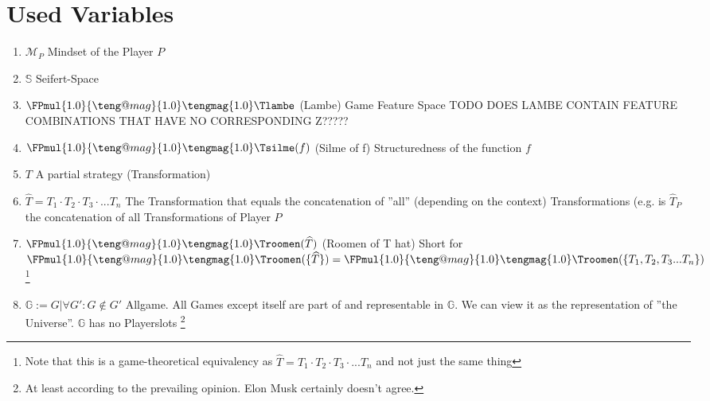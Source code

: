 \documentclass[11pt]{scrartcl}
\makeatletter
\def \teng@tempmag {1.0}
\newcommand{\tengmagMult}[1]{
    \FPmul{\teng@tempmag}{\teng@mag}{#1}%
    \tengmag{\teng@tempmag}
}
\newcommand{\TMath}[1]{\mathchoice
{\tengmagMult{1.0}\text{#1} }%
{\tengmagMult{1.0}\text{#1} }%
{\tengmagMult{0.8}\text{#1} }%
{\tengmagMult{0.5}\text{#1} }%
}
\newcommand{\MTsilme}{\TMath{\Tsilme}}
\newcommand{\MTlambe}{\TMath{\Tlambe}}
\newcommand{\MTroomen}{\TMath{\Troomen}}
\makeatother
\begin{document}
\section{Used Variables}
\begin{enumerate}
	\item $\mathcal{M}_P$ Mindset of the Player $P$
	\item $\mathbb{S}$ Seifert-Space
	\item $\MTlambe$ (Lambe) Game Feature Space TODO DOES LAMBE CONTAIN FEATURE COMBINATIONS THAT HAVE NO CORRESPONDING Z?????
	\item $\MTsilme(f) $ (Silme of f) Structuredness of the function $f$
	\item $T$ A partial strategy (Transformation)
	\item $\widehat{T} = T_1 \cdot T_2 \cdot T_3 \cdot ... T_n$ The Transformation that equals the concatenation of ''all'' (depending on the context) Transformations (e.g. is $\widehat{T}_P$ the concatenation of all Transformations of Player $P$
	\item $\MTroomen(\widehat{T})$ (Roomen of T hat) Short for $\MTroomen(\{\widehat{T}\}) =\MTroomen(\{{T_1, T_2, T_3 ... T_n}\}) $ \footnote{Note that this is a game-theoretical equivalency as $\widehat{T} = T_1 \cdot T_2 \cdot T_3 \cdot ... T_n$ and not just the same thing}
	\item $\mathbb{G} := G | \forall G': G \notin G' $ Allgame. All Games except itself are part of and representable in $\mathbb{G}$. We can view it as the representation of ''the Universe''. $\mathbb{G}$ has no Playerslots \footnote{At least according to the prevailing opinion. Elon Musk certainly doesn't agree.}
\end{enumerate}
\end{document}
